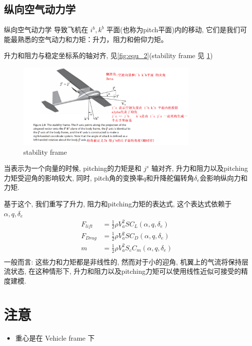 \documentclass[UTF8,a4paper,10pt,nocolorlinks]{ctexart}
\begin{document}
    \subsection{纵向空气动力学}
    纵向空气动力学 导致飞机在 $i^{b}, k^{b}$ 平面(也称为pitch平面)内的移动, 它们是我们可能最熟悉的空气动力和力矩：升力，阻力和俯仰力矩。
    \par
    升力和阻力与稳定坐标系的轴对齐, 见\ref{fig:equ_2}(stability frame 见 \ref{fig:stable})
    \begin{figure}
      \centering
      \includegraphics[width=0.8\textwidth]{picture/stability_frame.png}
      \caption{stability frame}
      \label{fig:stable}
    \end{figure}
    当表示为一个向量的时候, pitching的力矩是和 $j^{s}$ 轴对齐, 升力和阻力以及pitching力矩受迎角的影响较大, 同时, pitch角的变换率$q$和升降舵偏转角$\delta_{e}$会影响纵向力和力矩. \par
    基于这个, 我们重写了升力, 阻力和pitching力矩的表达式, 这个表达式依赖于 $\alpha, q, \delta_{e}$
    \begin{equation}
      \begin{split}
      F_{lift} &= \frac{1}{2} \rho V_{a}^{2}SC_{L}(\alpha, q, \delta_{e}) \\
      F_{Drag} &= \frac{1}{2} \rho V_{a}^{2}SC_{D}(\alpha, q, \delta_{e}) \\
      m &= \frac{1}{2} \rho V_{a}^{2}S_{c}C_{m}(\alpha, q, \delta_{e}) \\
    \end{split}
  \end{equation}
  一般而言: 这些力和力矩都是非线性的, 然而对于小的迎角, 机翼上的气流将保持层流状态, 在这种情形下, 升力和阻力以及pitching力矩可以使用线性近似可接受的精度建模. 




    \clearpage





    \section{注意}
    \begin{itemize}
      \item 重心是在 Vehicle frame 下
    \end{itemize}
\end{document}
